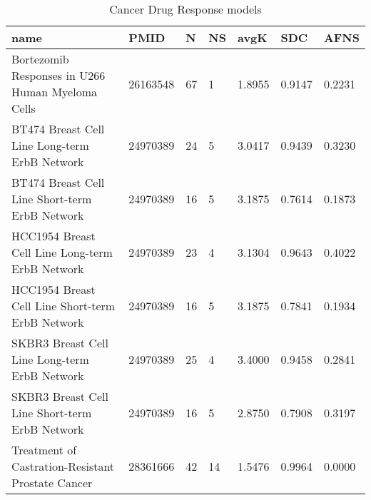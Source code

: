 \begin{table}
\caption{Cancer Drug Response models}
\label{tab:Cancer_Drug_Response}
\begin{tabular}{|p{180pt}||p{40pt}|p{25pt}|p{25pt}|p{40pt}|p{25pt}|p{25pt}|}
\toprule
name & PMID & N & NS & avgK & SDC & AFNS \\
\midrule
Bortezomib Responses in U266 Human Myeloma Cells & 26163548 & 67 & 1 & 1.8955 & 0.9147 & 0.2231 \\
BT474 Breast Cell Line Long-term ErbB Network & 24970389 & 24 & 5 & 3.0417 & 0.9439 & 0.3230 \\
BT474 Breast Cell Line Short-term ErbB Network & 24970389 & 16 & 5 & 3.1875 & 0.7614 & 0.1873 \\
HCC1954 Breast Cell Line Long-term ErbB Network & 24970389 & 23 & 4 & 3.1304 & 0.9643 & 0.4022 \\
HCC1954 Breast Cell Line Short-term ErbB Network & 24970389 & 16 & 5 & 3.1875 & 0.7841 & 0.1934 \\
SKBR3 Breast Cell Line Long-term ErbB Network & 24970389 & 25 & 4 & 3.4000 & 0.9458 & 0.2841 \\
SKBR3 Breast Cell Line Short-term ErbB Network & 24970389 & 16 & 5 & 2.8750 & 0.7908 & 0.3197 \\
Treatment of Castration-Resistant Prostate Cancer & 28361666 & 42 & 14 & 1.5476 & 0.9964 & 0.0000 \\
\bottomrule
\end{tabular}
\end{table}
